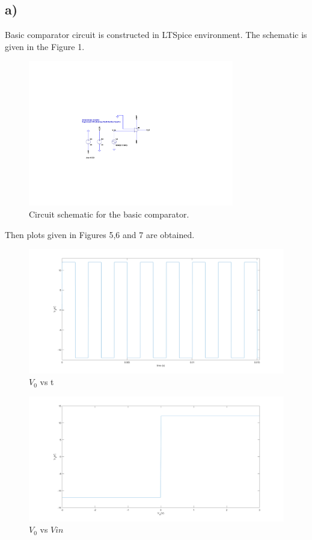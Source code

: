 \documentclass[letterpaper,12pt]{article}
\begin{document}
\subsection{a)}
Basic comparator circuit is constructed in LTSpice environment. The schematic is given in the Figure 1.
\begin{figure}[H]
	\centering
   \includegraphics[width=0.8\textwidth]{BasicComparator_SCH.pdf}
   \caption{Circuit schematic for the basic comparator.}
\end{figure} 
Then plots given in Figures 5,6 and 7 are obtained.
\begin{figure}[H]
	\centering
   \includegraphics[width=1\textwidth]{3a_vs_t.png}
   \caption{\(V_0\) vs t}
\end{figure}

\begin{figure}[H]
	\centering
   \includegraphics[width=1\textwidth]{3a_vs_vin.png}
   \caption{\(V_0\) vs \(V{in}\)}
\end{figure}
\end{document}
